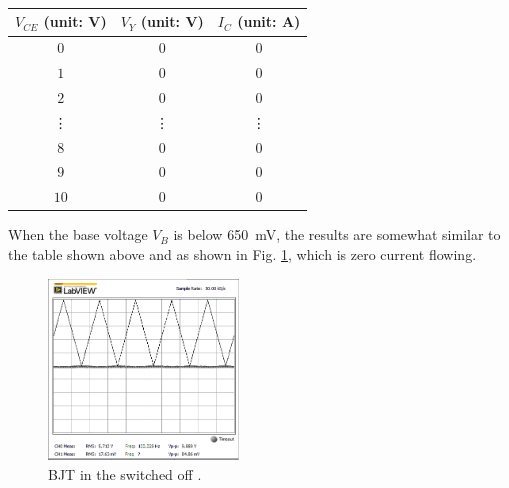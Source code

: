 \documentclass[journal]{IEEEtran}
\begin{document}
\subsubsection{}
\begin{center}
    \begin{tabular}{ |c|c|c| }
        \hline
        $V_{CE}$ (unit: \si{\volt}) & $V_{Y}$ (unit: \si{\volt})&  $I_{C}$ (unit: \si{\ampere})\\
        \hline
        $0$ & $0$ & $0$ \\
        \hline
        $1$ & $0$ & $0$ \\
        \hline
        $2$ & $0$ & $0$ \\
        \hline
        \vdots & \vdots & \vdots \\
        \hline
        $8$ & $0$ & $0$ \\
        \hline
        $9$ & $0$ & $0$ \\
        \hline
        $10$ & $0$ & $0$ \\
        \hline
    \end{tabular}
\end{center}
\par When the base voltage $V_{B}$ is below \SI{650}{\mV}, the results are somewhat similar
to the table shown above and as shown in Fig. \ref{fig-3-2}, which is zero current flowing.
\begin{figure}[h]
  \centering
  \includegraphics[width=0.45\textwidth]{images/3-2.png}
  \caption{BJT in the switched off .}
  \label{fig-3-2}
\end{figure}
\end{document}

